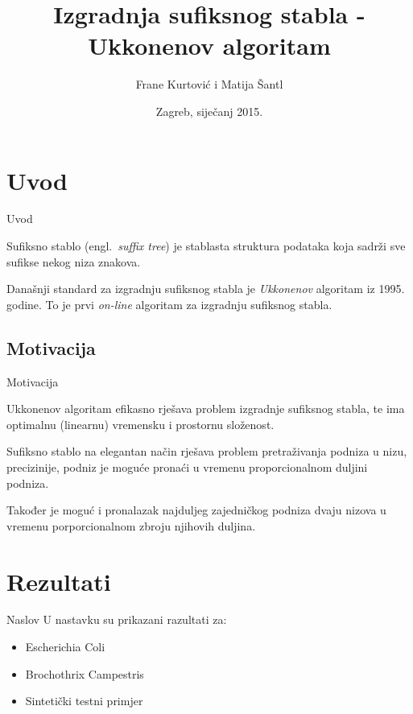 \documentclass[utf8]{beamer}
\title[Projekt]{Izgradnja sufiksnog stabla - Ukkonenov algoritam}
\author{Frane Kurtović i Matija Šantl}
\institute{Bioinformatika\\*Fakultet elektrotehnike i računarstva}
\date{Zagreb, siječanj 2015.}
\newcommand{\engl}[1]{(engl.~\emph{#1})}
\begin{document}
\begin{frame}
\titlepage
\end{frame}


\section{Uvod}
\begin{frame}{Uvod}

	Sufiksno stablo \engl{suffix tree} je stablasta struktura podataka koja sadrži sve sufikse nekog niza znakova. 
	
	\vspace{5mm}

	Današnji standard za izgradnju sufiksnog stabla je \textit{Ukkonenov} algoritam iz 1995. godine. To je prvi \textit{on-line} algoritam za izgradnju sufiksnog stabla.
	
\end{frame}

\subsection{Motivacija}
\begin{frame}{Motivacija}

	Ukkonenov algoritam efikasno rješava problem izgradnje sufiksnog stabla, te ima optimalnu (linearnu) vremensku i prostornu složenost. 

	\vspace{5mm}

	Sufiksno stablo na elegantan način rješava problem pretraživanja podniza u nizu, precizinije, podniz je moguće pronaći u vremenu proporcionalnom duljini podniza. 

	\vspace{5mm}

	Također je moguć i pronalazak najduljeg zajedničkog podniza dvaju nizova u vremenu porporcionalnom zbroju njihovih duljina.

\end{frame}

\section{Rezultati}
\begin{frame}{Naslov}
U  nastavku su prikazani razultati za:
\begin{itemize}
	\vspace{5mm}
	\item Escherichia Coli
	\vspace{5mm}
	\item Brochothrix Campestris
	\vspace{5mm}
	\item Sintetički testni primjer
\end{itemize}
\end{frame}
\end{document}
